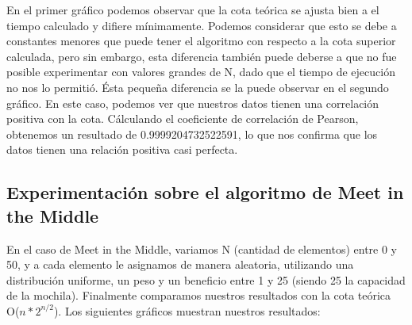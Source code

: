 En el primer gráfico podemos observar que la cota teórica se ajusta bien a el tiempo calculado y difiere mínimamente. Podemos considerar que esto se debe a constantes menores que puede tener el algoritmo con respecto a la cota superior calculada, pero sin embargo, esta diferencia también puede deberse a que no fue posible experimentar con valores grandes de N, dado que el tiempo de ejecución no nos lo permitió.
\newline
Ésta pequeña diferencia se la puede observar en el segundo gráfico. En este caso, podemos ver que nuestros datos tienen una correlación positiva con la cota. Cálculando el coeficiente de correlación de Pearson, obtenemos un resultado de 0.9999204732522591, lo que nos confirma que los datos tienen una relación positiva casi perfecta.

\subsection{Experimentación sobre el algoritmo de Meet in the Middle}

En el caso de Meet in the Middle, variamos N (cantidad de elementos) entre 0 y 50, y a cada elemento le asignamos de manera aleatoria, utilizando una distribución uniforme, un peso y un beneficio entre 1 y 25 (siendo 25 la capacidad de la mochila). Finalmente comparamos nuestros resultados con la cota teórica O($n*2^{n/2}$). Los siguientes gráficos muestran nuestros resultados:

